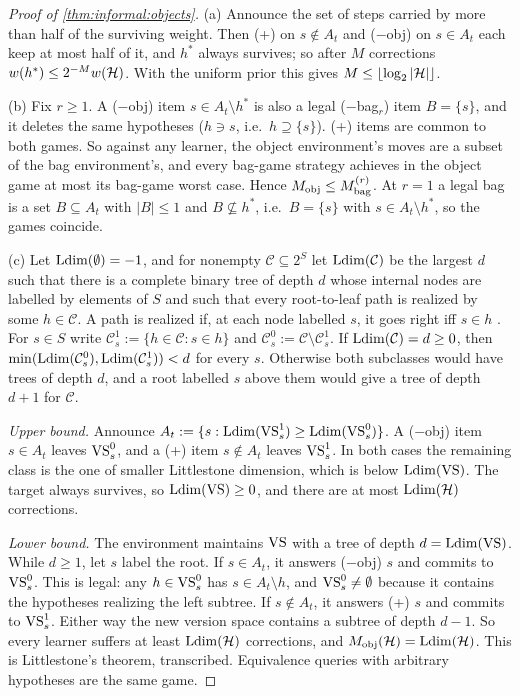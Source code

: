 \begin{proof}[Proof of \cref{thm:informal:objects}]
(a) Announce the set of steps carried by more than half of the surviving weight. Then (+) on $s\notin A_t$ and (\(-\)obj) on $s\in A_t$ each keep at most half of it, and $h^*$ always survives; so after $M$ corrections $w(h^*)\le2^{-M}w(\mathcal{H})$. With the uniform prior this gives $M\le\lfloor\log_2|\mathcal{H}|\rfloor$.

(b) Fix $r\ge1$. A (\(-\)obj) item $s\in A_t\setminus h^*$ is also a legal (\(-\)bag$_r$) item $B=\{s\}$, and it deletes the same hypotheses ($h\ni s$, i.e.\ $h\supseteq\{s\}$). (+) items are common to both games. So against any learner, the object environment's moves are a subset of the bag environment's, and every bag-game strategy achieves in the object game at most its bag-game worst case. Hence $M_{\mathrm{obj}}\le M^{(r)}_{\mathrm{bag}}$. At $r=1$ a legal bag is a set $B\subseteq A_t$ with $|B|\le1$ and $B\not\subseteq h^*$, i.e.\ $B=\{s\}$ with $s\in A_t\setminus h^*$, so the games coincide.

(c) Let $\mathrm{Ldim}(\emptyset)=-1$, and for nonempty $\mathcal C\subseteq2^S$ let $\mathrm{Ldim}(\mathcal C)$ be the largest $d$ such that there is a complete binary tree of depth $d$ whose internal nodes are labelled by elements of $S$ and such that every root-to-leaf path is realized by some $h\in\mathcal C$. A path is realized if, at each node labelled $s$, it goes right iff $s\in h$ \citep{littlestone1988learning}. For $s\in S$ write $\mathcal C^1_s:=\{h\in\mathcal C:s\in h\}$ and $\mathcal C^0_s:=\mathcal C\setminus\mathcal C^1_s$. If $\mathrm{Ldim}(\mathcal C)=d\ge0$, then $\min(\mathrm{Ldim}(\mathcal C^0_s),\mathrm{Ldim}(\mathcal C^1_s))<d$ for every $s$. Otherwise both subclasses would have trees of depth $d$, and a root labelled $s$ above them would give a tree of depth $d+1$ for $\mathcal C$.

\emph{Upper bound.} Announce $A_t:=\{s:\mathrm{Ldim}(\mathrm{VS}^1_s)\ge\mathrm{Ldim}(\mathrm{VS}^0_s)\}$. A (\(-\)obj) item $s\in A_t$ leaves $\mathrm{VS}^0_s$, and a (+) item $s\notin A_t$ leaves $\mathrm{VS}^1_s$. In both cases the remaining class is the one of smaller Littlestone dimension, which is below $\mathrm{Ldim}(\mathrm{VS})$. The target always survives, so $\mathrm{Ldim}(\mathrm{VS})\ge0$, and there are at most $\mathrm{Ldim}(\mathcal{H})$ corrections.

\emph{Lower bound.} The environment maintains $\mathrm{VS}$ with a tree of depth $d=\mathrm{Ldim}(\mathrm{VS})$. While $d\ge1$, let $s$ label the root. If $s\in A_t$, it answers (\(-\)obj) $s$ and commits to $\mathrm{VS}^0_s$. This is legal: any $h\in\mathrm{VS}^0_s$ has $s\in A_t\setminus h$, and $\mathrm{VS}^0_s\ne\emptyset$ because it contains the hypotheses realizing the left subtree. If $s\notin A_t$, it answers (+) $s$ and commits to $\mathrm{VS}^1_s$. Either way the new version space contains a subtree of depth $d-1$. So every learner suffers at least $\mathrm{Ldim}(\mathcal{H})$ corrections, and $M_{\mathrm{obj}}(\mathcal{H})=\mathrm{Ldim}(\mathcal{H})$. This is Littlestone's theorem, transcribed. Equivalence queries with arbitrary hypotheses \citep{angluin1988queries} are the same game.
\end{proof}

